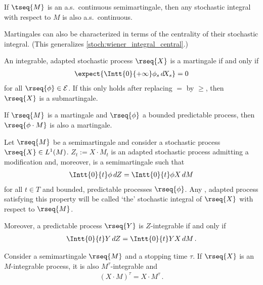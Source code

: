     \begin{property}[Continuity]
        If $\tseq{M}$ is an a.s.~continuous semimartingale, then any stochastic integral with respect to $M$ is also a.s.~continuous.
    \end{property}

    Martingales can also be characterized in terms of the centrality of their stochastic integral. (This generalizes \cref{stoch:wiener_integral_central}.)
    \begin{property}[Centrality]
        An integrable, adapted stochastic process $\rseq{X}$ is a martingale if and only if
        \begin{gather}
            \expect{\Intt{0}{+\infty}\phi_s\,d\!X_s}=0
        \end{gather}
        for all $\rseq{\phi}\in\mathcal{E}$. If this only holds after replacing $=$ by $\geq$, then $\rseq{X}$ is a submartingale.
    \end{property}

    \begin{property}[Stability]
        If $\rseq{M}$ is a martingale and $\rseq{\phi}$ a bounded predictable process, then $\rseq{\phi\cdot M}$ is also a martingale.
    \end{property}

    \begin{property}
        Let $\rseq{M}$ be a semimartingale and consider a stochastic process $\rseq{X}\in L^1(M)$. $Z_t := X\cdot M_t$ is an adapted stochastic process admitting a \cdlg modification and, moreover, is a semimartingale such that
        \begin{gather}
            \Intt{0}{t}\phi\,dZ = \Intt{0}{t}\phi X\,dM
        \end{gather}
        for all $t\in T$ and bounded, predictable processes $\rseq{\phi}$. Any \cdlgg, adapted process satisfying this property will be called `the' stochastic integral of $\rseq{X}$ with respect to $\rseq{M}$.

        Moreover, a predictable process $\rseq{Y}$ is $Z$-integrable if and only if
        \begin{gather}
            \Intt{0}{t}Y\,dZ = \Intt{0}{t}YX\,dM\,.
        \end{gather}
    \end{property}

    \begin{property}
        Consider a semimartingale $\rseq{M}$ and a stopping time $\tau$. If $\rseq{X}$ is an $M$-integrable process, it is also $M^\tau$-integrable and
        \begin{gather}
            \left(X\cdot M\right)^\tau = X\cdot M^\tau\,.
        \end{gather}
    \end{property}

